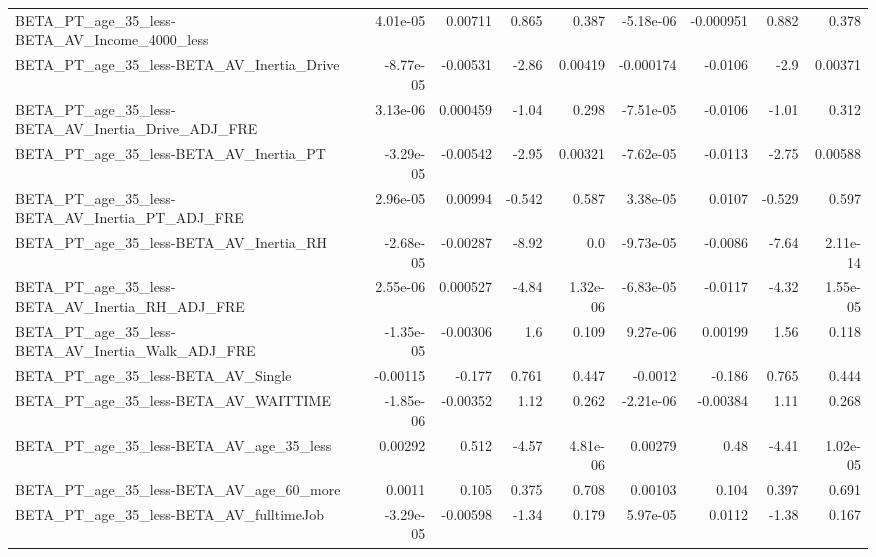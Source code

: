 \begin{tabular}{lrrrrrrrr}
BETA\_PT\_age\_35\_less-BETA\_AV\_Income\_4000\_less       &    4.01e-05 &      0.00711 &    0.865 &    0.387 &  -5.18e-06 &   -0.000951 &        0.882 &         0.378 \\
BETA\_PT\_age\_35\_less-BETA\_AV\_Inertia\_Drive          &   -8.77e-05 &     -0.00531 &    -2.86 &  0.00419 &  -0.000174 &     -0.0106 &         -2.9 &       0.00371 \\
BETA\_PT\_age\_35\_less-BETA\_AV\_Inertia\_Drive\_ADJ\_FRE  &    3.13e-06 &     0.000459 &    -1.04 &    0.298 &  -7.51e-05 &     -0.0106 &        -1.01 &         0.312 \\
BETA\_PT\_age\_35\_less-BETA\_AV\_Inertia\_PT             &   -3.29e-05 &     -0.00542 &    -2.95 &  0.00321 &  -7.62e-05 &     -0.0113 &        -2.75 &       0.00588 \\
BETA\_PT\_age\_35\_less-BETA\_AV\_Inertia\_PT\_ADJ\_FRE     &    2.96e-05 &      0.00994 &   -0.542 &    0.587 &   3.38e-05 &      0.0107 &       -0.529 &         0.597 \\
BETA\_PT\_age\_35\_less-BETA\_AV\_Inertia\_RH             &   -2.68e-05 &     -0.00287 &    -8.92 &      0.0 &  -9.73e-05 &     -0.0086 &        -7.64 &      2.11e-14 \\
BETA\_PT\_age\_35\_less-BETA\_AV\_Inertia\_RH\_ADJ\_FRE     &    2.55e-06 &     0.000527 &    -4.84 & 1.32e-06 &  -6.83e-05 &     -0.0117 &        -4.32 &      1.55e-05 \\
BETA\_PT\_age\_35\_less-BETA\_AV\_Inertia\_Walk\_ADJ\_FRE   &   -1.35e-05 &     -0.00306 &      1.6 &    0.109 &   9.27e-06 &     0.00199 &         1.56 &         0.118 \\
BETA\_PT\_age\_35\_less-BETA\_AV\_Single                 &    -0.00115 &       -0.177 &    0.761 &    0.447 &    -0.0012 &      -0.186 &        0.765 &         0.444 \\
BETA\_PT\_age\_35\_less-BETA\_AV\_WAITTIME               &   -1.85e-06 &     -0.00352 &     1.12 &    0.262 &  -2.21e-06 &    -0.00384 &         1.11 &         0.268 \\
BETA\_PT\_age\_35\_less-BETA\_AV\_age\_35\_less            &     0.00292 &        0.512 &    -4.57 & 4.81e-06 &    0.00279 &        0.48 &        -4.41 &      1.02e-05 \\
BETA\_PT\_age\_35\_less-BETA\_AV\_age\_60\_more            &      0.0011 &        0.105 &    0.375 &    0.708 &    0.00103 &       0.104 &        0.397 &         0.691 \\
BETA\_PT\_age\_35\_less-BETA\_AV\_fulltimeJob            &   -3.29e-05 &     -0.00598 &    -1.34 &    0.179 &   5.97e-05 &      0.0112 &        -1.38 &         0.167 \\

\end{tabular}

